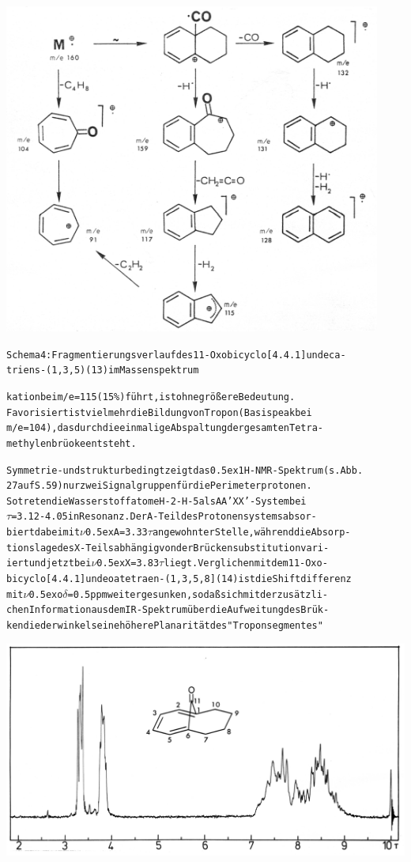 \documentclass[a4paper,11pt]{article}
\begin{document}
\hspace*{0.25cm}\includegraphics[width=12.4cm]{SCHEMA_004}
\begin{alltt}
Schema 4: Fragmentierungsverlauf des 11-Oxobicyclo[4.4.1]undeca-
triens-(1,3,5) (13) im Massenspektrum

kation bei m/e = 115 (15 \%) führt, ist ohne größere Bedeutung.
Favorisiert ist vielmehr die Bildung von Tropon (Basispeak bei
m/e = 104), das durch die einmalige Abspaltung der gesamten Tetra-
methylenbrüoke entsteht.

Symmetrie- und strukturbedingt zeigt das \raise0.5ex\hbox{1}H-NMR-Spektrum (s. Abb.
27 auf S. 59) nur zwei Signalgruppen für die Perimeterprotonen.
So treten die Wasserstoffatome H-2 - H-5 als AA'XX'-System bei
\(\tau\) = 3.12 - 4.05 in Resonanz. Der A-Teil des Protonensystems absor-
biert dabei mit \(\nu\)\lower0.5ex\hbox{A} = 3.33\(\tau\) an gewohnter Stelle, während die Absorp-
tionslage des X-Teils abhängig von der Brückensubstitution vari-
iert und jetzt bei \(\nu\)\lower0.5ex\hbox{X} = 3.83\(\tau\) liegt. Verglichen mit dem 11-Oxo-
bicyclo[4.4.1]undeoatetraen-(1‚3,5,8] (14) ist die Shiftdifferenz
mit \(\nu\)\lower0.5ex\hbox{o}\(\delta\) = 0.5 ppm weiter gesunken, so daß sich mit der zusätzli-
chen Information aus dem IR-Spektrum über die Aufweitung des Brük-
kendiederwinkels eine höhere Planarität des "Troponsegmentes"
\newpage
{}


\end{alltt}
\hspace*{-0.25cm}\includegraphics[width=14.427cm]{NMR_027}
\end{document}

